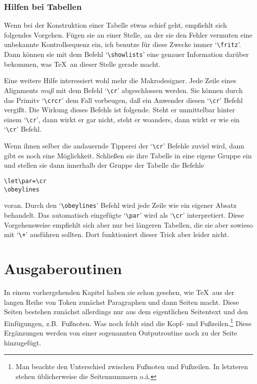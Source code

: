 \subsection{Hilfen bei Tabellen}
Wenn bei der Konstruktion einer Tabelle etwas schief geht, empfiehlt
sich folgendes Vorgehen. F\"ugen sie an einer Stelle, an der sie den
Fehler vermuten eine unbekannte 
Kontrollsequenz ein, ich benutze f\"ur
diese Zwecke immer `\verb|\fritz|'. Dann k\"onnen sie mit dem Befehl
`\verb|\showlists|' eine genauer Information dar\"uber bekommen, was
\TeX\ an dieser Stelle gerade macht.

Eine weitere Hilfe interessiert wohl mehr die 
Makrodesigner. Jede
Zeile eines Alignments {\em mu\ss{}} mit dem Befehl `\verb|\cr|'
abgeschlossen werden. Sie k\"onnen durch das Primitv
`\verb|\crcr|' dem
Fall vorbeugen, da\ss{} ein Anwender diesen `\verb|\cr|' Befehl vergi\ss{}t.
Die Wirkung dieses Befehls ist folgende. Steht er unmittelbar hinter
einem `\verb|\cr|', dann wirkt er gar nicht, steht er woanders, dann
wirkt er wie ein `\verb|\cr|' Befehl.

Wenn ihnen selber die andauernde Tipperei der `\verb|\cr|' Befehle
zuviel wird, dann gibt es noch eine M\"oglichkeit. Schlie\ss{}en sie ihre
Tabelle in eine eigene Gruppe ein und stellen sie dann innerhalb der
Gruppe der Tabelle die Befehle
\begin{verbatim}
\let\par=\cr
\obeylines
\end{verbatim}
voran. Durch den `\verb|\obeylines|' Befehl wird jede Zeile wie ein
eigener 
Absatz behandelt. Das automatisch eingef\"ugte
`\verb|\par|'
wird als `\verb|\cr|' interpretiert. Diese Vorgehensweise empfiehlt
sich aber nur bei l\"angeren Tabellen, die sie aber sowieso mit
`\verb|\+|' ausf\"uhren sollten. Dort funktioniert dieser Trick aber
leider nicht.

\chapter{Ausgaberoutinen}
In einem vorhergehenden Kapitel haben sie schon gesehen, wie \TeX\ aus
der langen Reihe von Token zun\"achst Paragraphen und dann Seiten macht.
Diese Seiten bestehen zun\"achst allerdings nur aus dem eigentlichen
Seitentext und den 
Einf\"ugungen, z.B.\ Fu\ss{}noten. Was noch fehlt sind
die Kopf- und 
Fu\ss{}zeilen.\footnote{Man beachte den Unterschied zwischen
Fu\ss{}noten und Fu\ss{}zeilen. In letzteren stehen \"ublicherweise die
Seitennummern o.\"a.} Diese Erg\"anzungen werden von einer sogenannten
Outputroutine noch zu der Seite hinzugef\"ugt.
